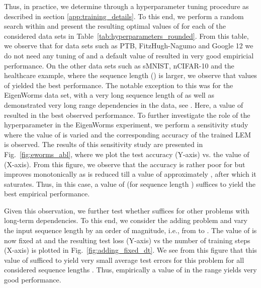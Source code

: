 \documentclass{article} \usepackage{iclr2022_conference,times}
\newcommand{\fref}[1] {Fig.~\ref{#1}}
\newcommand{\Tref}[1]{Table~\ref{#1}}
\begin{document}
Thus, in practice, we determine  through a hyperparameter tuning procedure as described in section \ref{app:training_details}. To this end, we perform a random search within  and present the resulting optimal values of  for each of the considered data sets in \Tref{tab:hyperparameters_rounded}. From this table, we observe that for data sets such as PTB, FitzHugh-Nagumo and Google 12
we do not need any tuning of  and a default value of  resulted in very good empiricial performance. On the other data sets such as sMNIST, nCIFAR-10 and the healthcare example, where the sequence length () is larger, we observe that values of  yielded the best performance. The notable exception to this was for the EigenWorms data set, with a very long sequence length of  as well as demonstrated very long range dependencies in the data, see \cite{unicornn}. Here, a value of  resulted in the best observed performance. To further investigate the role of the hyperparameter  in the EigenWorms experiment, we perform a sensitivity study where the value of  is varied and the corresponding accuracy of the trained LEM is observed. The results of this sensitivity study are presented in \fref{fig:eworms_abl}, where we plot the test accuracy (Y-axis) vs. the value of  (X-axis). From this figure, we observe that the accuracy is rather poor for  but improves monotonically as  is reduced till a value of approximately , after which it saturates. Thus, in this case, a value of  (for sequence length ) suffices to yield the best empirical performance. 

Given this observation, we further test whether  suffices for other problems with long-term dependencies. To this end, we consider the adding problem and vary the input sequence length by an order of magnitude, i.e., from  to . The value of  is now fixed at  and the resulting test loss (Y-axis) vs the number of training steps (X-axis) is plotted in \fref{fig:adding_fixed_dt}. We see from this figure that this value of  sufficed to yield very small average test errors for this problem for all considered sequence lengths . Thus, empirically a value of  in the range  yields very good performance. 
\end{document}
